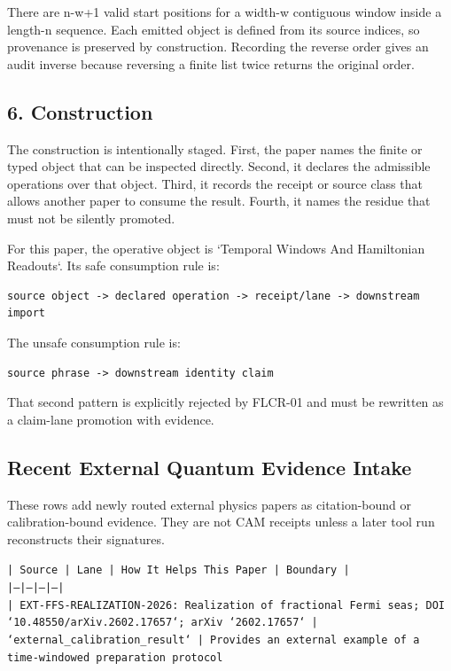 \documentclass[11pt]{article}
\begin{document}
There are n-w+1 valid start positions for a width-w contiguous window inside a length-n sequence. Each emitted object is defined from its source indices, so provenance is preserved by construction. Recording the reverse order gives an audit inverse because reversing a finite list twice returns the original order.

\subsection*{6. Construction}

The construction is intentionally staged. First, the paper names the finite or
typed object that can be inspected directly. Second, it declares the admissible
operations over that object. Third, it records the receipt or source class that
allows another paper to consume the result. Fourth, it names the residue that
must not be silently promoted.

For this paper, the operative object is `Temporal Windows And Hamiltonian Readouts`. Its safe consumption
rule is:

\begin{verbatim}
source object -> declared operation -> receipt/lane -> downstream import
\end{verbatim}

The unsafe consumption rule is:

\begin{verbatim}
source phrase -> downstream identity claim
\end{verbatim}

That second pattern is explicitly rejected by FLCR-01 and must be rewritten as
a claim-lane promotion with evidence.

\subsection*{Recent External Quantum Evidence Intake}

These rows add newly routed external physics papers as citation-bound or calibration-bound evidence. They are not CAM receipts unless a later tool run reconstructs their signatures.

\noindent\texttt{| Source | Lane | How It Helps This Paper | Boundary |}\\
\noindent\texttt{|---|---|---|---|}\\
\noindent\texttt{| EXT-FFS-REALIZATION-2026: Realization of fractional Fermi seas; DOI `10.48550/arXiv.2602.17657`; arXiv `2602.17657` | `external\_calibration\_result` | Provides an external example of a time-windowed preparation protocol}\\
\end{document}
